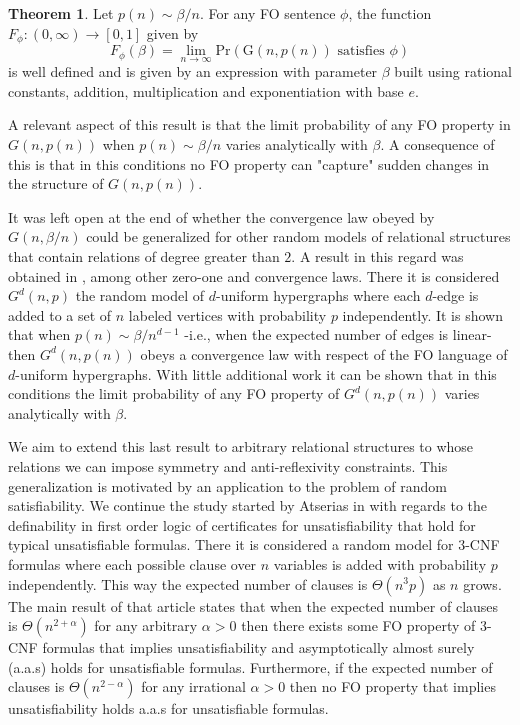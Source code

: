 \documentclass[12pt,notitlepage,a4paper]{article}
\theoremstyle{definition}
\newtheorem*{theorem*}{Theorem}
\newcommand{\Ln}{\lim\limits_{n\to \infty}}
\begin{document}
\begin{theorem*}
	Let $p(n)\sim \beta/n$. For any FO sentence $\phi$, the function
	$F_\phi: (0,\infty)\rightarrow [0,1]$ given by 
	\[ F_\phi(\beta) = \Ln \mathrm{Pr}\left( \mathrm{G}(n,p(n))
	\text{ satisfies } \phi   \right) \]
	is well defined and is given by an expression with parameter $\beta$ built
	using rational constants, addition, multiplication and exponentiation with base $e$.
\end{theorem*}

A relevant aspect of this result is that the limit probability of any FO
property in $G(n,p(n))$ when $p(n)\sim \beta/n$ varies analytically with $\beta$.
A consequence of this is that in this conditions no FO property can "capture" sudden changes 
in the structure of $G(n,p(n))$. \par
It was left open at the end of \cite{lynch1992probabilities} whether the convergence law obeyed
by $G(n,\beta/n)$ could be generalized for other random models of relational structures
that contain relations of degree greater than $2$.
A result in this regard was obtained in \cite{salvadorbrasil}, 
among other zero-one and convergence laws.
There it is considered $G^d(n,p)$ the random model of $d$-uniform hypergraphs where
each $d$-edge is added to a set of $n$ labeled vertices with probability $p$ independently.
It is shown that when $p(n)\sim \beta/n^{d-1}$ -i.e., when the expected number of
edges is linear- then $G^d(n,p(n))$ obeys a convergence law with respect of the FO
language of $d$-uniform hypergraphs. With little additional work it can be shown that
in this conditions the limit probability of any FO property of $G^d(n,p(n))$ varies 
analytically with $\beta$. \par
We aim to extend this last result to arbitrary relational structures
to whose relations we can impose symmetry and anti-reflexivity constraints. 
This generalization is motivated by an application to the problem of random 
satisfiability. We continue the study started by Atserias in \cite{atserias2005definability}
with regards to the definability in first order logic of certificates for unsatisfiability
that hold for typical unsatisfiable formulas. There it is considered a random model for
$3$-CNF formulas where each possible clause over $n$ variables is added with probability $p$ 
independently. This way the expected number of clauses is $\Theta(n^3p)$ as $n$ grows.
The main result of that article states that when the expected number of clauses is $\Theta(n^{2+\alpha})$
for any arbitrary $\alpha>0$ then there exists some FO property of $3$-CNF formulas that implies
unsatisfiability and asymptotically almost surely (a.a.s) holds for unsatisfiable formulas. 
Furthermore, if the expected number of clauses is $\Theta(n^{2-\alpha})$ for any irrational
$\alpha>0$ then no FO property that implies unsatisfiability holds a.a.s
for unsatisfiable formulas. 
\end{document}
